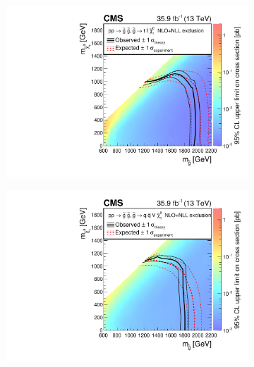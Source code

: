 \begin{figure}[hbp!]
\centering
\begin{subfigure}{0.4\textwidth}
\centering
\includegraphics[width=\textwidth]{figs/CMS-SUS-16-033_Figure_012-a.pdf}  
\end{subfigure}
\begin{subfigure}{0.4\textwidth}
\centering
\includegraphics[width=\textwidth]{figs/CMS-SUS-16-033_Figure_012-d.pdf}
\end{subfigure}

\end{figure}
